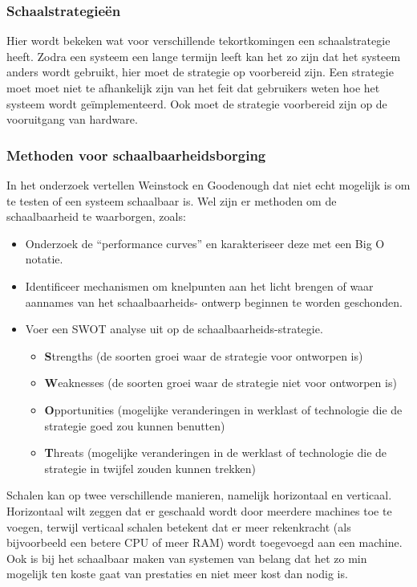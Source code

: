 \subsubsection{Schaalstrategieën}
Hier wordt bekeken wat voor verschillende tekortkomingen een schaalstrategie heeft. Zodra een systeem een lange termijn leeft kan het zo zijn dat het systeem anders wordt gebruikt, hier moet de strategie op voorbereid zijn. Een strategie moet moet niet te afhankelijk zijn van het feit dat gebruikers weten hoe het systeem wordt geïmplementeerd. Ook moet de strategie voorbereid zijn op de vooruitgang van hardware.

\subsubsection{Methoden voor schaalbaarheidsborging}
In het onderzoek vertellen Weinstock en Goodenough dat niet echt mogelijk is om te testen of een systeem schaalbaar is. Wel zijn er methoden om de schaalbaarheid te waarborgen, zoals:
\begin{itemize}
	\item Onderzoek de \enquote{performance curves} en karakteriseer deze met een Big O notatie.
	\item Identificeer mechanismen om knelpunten aan het licht brengen of waar aannames van het schaalbaarheids- ontwerp beginnen te worden geschonden.
	\item Voer een SWOT analyse uit op de schaalbaarheids-strategie.
	\begin{itemize}
		\item \textbf{S}trengths (de soorten groei waar de strategie voor ontworpen is)
		\item \textbf{W}eaknesses (de soorten groei waar de strategie niet voor ontworpen is)
		\item \textbf{O}pportunities (mogelijke veranderingen in werklast of technologie die de strategie goed zou kunnen benutten)
		\item \textbf{T}hreats (mogelijke veranderingen in de werklast of technologie die de strategie in twijfel zouden kunnen trekken)
	\end{itemize}
\end{itemize}

Schalen kan op twee verschillende manieren, namelijk horizontaal en verticaal. Horizontaal wilt zeggen dat er geschaald wordt door meerdere machines toe te voegen, terwijl verticaal schalen betekent dat er  meer rekenkracht (als bijvoorbeeld een betere CPU of meer RAM) wordt toegevoegd aan een machine. Ook is bij het schaalbaar maken van systemen van belang dat het zo min mogelijk ten koste gaat van prestaties en niet meer kost dan nodig is.

